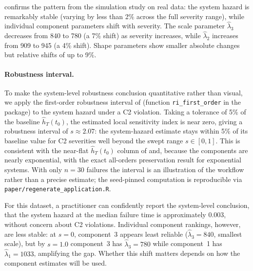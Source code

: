  confirms the pattern from the simulation study on
real data: the system hazard is remarkably stable (varying by less than 2\%
across the full severity range), while individual component parameters shift
with severity. The scale parameter $\hat\lambda_3$ decreases from 840 to 780
(a 7\% shift) as severity increases, while $\hat\lambda_2$ increases from 909
to 945 (a 4\% shift). Shape parameters show smaller absolute changes but
relative shifts of up to 9\%.

\paragraph{Robustness interval.}
To make the system-level robustness conclusion quantitative rather than
visual, we apply the first-order robustness interval of
 (function \texttt{ri\_first\_order} in the
package) to the system hazard under a C2 violation. Taking a tolerance of
5\% of the baseline $\hat{h}_T(t_0)$, the estimated local sensitivity index
is near zero, giving a robustness interval of $s \approx 2.07$: the
system-hazard estimate stays within 5\% of its baseline value for C2
severities well beyond the swept range $s \in [0, 1]$. This is consistent
with the near-flat $\hat{h}_T(t_0)$ column of  and,
because the components are nearly exponential, with the exact all-orders
preservation result for exponential systems. With only $n = 30$ failures the
interval is an illustration of the workflow rather than a precise estimate;
the seed-pinned computation is reproducible via
\texttt{paper/regenerate\_application.R}.

For this dataset, a practitioner can confidently report the system-level
conclusion, that the system hazard at the median failure time is approximately
0.003, without concern about C2 violations. Individual component rankings,
however, are less stable: at $s = 0$, component~3 appears least reliable
($\hat\lambda_3 = 840$, smallest scale), but by $s = 1.0$ component~3 has
$\hat\lambda_3 = 780$ while component~1 has $\hat\lambda_1 = 1033$,
amplifying the gap. Whether this shift matters depends on how the component
estimates will be used.
